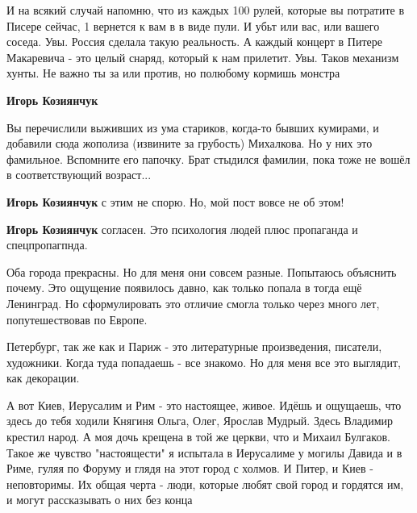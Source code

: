 \begin{itemize}
\begin{itemize}
\begin{itemize}

И на всякий случай напомню, что из каждых 100 рулей, которые вы потратите в
Писере сейчас, 1 вернется к вам в в виде пули. И убьт или вас, или вашего
соседа. Увы. Россия сделала такую реальность. А каждый концерт в Питере
Макаревича - это целый снаряд, который к нам прилетит. Увы. Таков механизм
хунты. Не важно ты за или против, но полюбому кормишь монстра

\textbf{Игорь Козиянчук} 

Вы перечислили выживших из ума стариков, когда-то бывших кумирами, и добавили
сюда жополиза (извините за грубость) Михалкова. Но у них это фамильное.
Вспомните его папочку. Брат стыдился фамилии, пока тоже не вошёл в
соответствующий возраст...

\textbf{Игорь Козиянчук} с этим не спорю. Но, мой пост вовсе не об этом!

\textbf{Игорь Козиянчук} согласен. Это психология людей плюс пропаганда и спецпропагпнда.
\end{itemize} %

\end{itemize} %


Оба города прекрасны. Но для меня они совсем разные. Попытаюсь объяснить
почему. Это ощущение появилось давно, как только попала в тогда ещё Ленинград.
Но сформулировать это отличие смогла только через много лет, попутешествовав по
Европе.

Петербург, так же как и Париж - это литературные произведения, писатели,
художники. Когда туда попадаешь - все знакомо. Но для меня все это выглядит,
как декорации.

А вот Киев, Иерусалим и Рим - это настоящее, живое. Идёшь и ощущаешь, что здесь
до тебя ходили Княгиня Ольга, Олег, Ярослав Мудрый. Здесь Владимир крестил
народ. А моя дочь крещена в той же церкви, что и Михаил Булгаков. Такое же
чувство "настоящести" я испытала в Иерусалиме у могилы Давида и в Риме, гуляя
по Форуму и глядя на этот город с холмов. И Питер, и Киев - неповторимы. Их
общая черта - люди, которые любят свой город и гордятся им, и могут
рассказывать о них без конца



\end{itemize}
